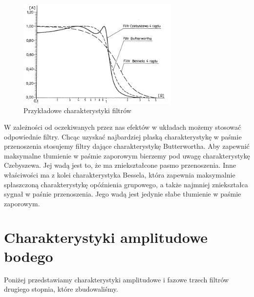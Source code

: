 \documentclass[a4paper,11pt]{article}
\begin{document}
\begin{figure} [H]
  \begin{center}
    \includegraphics[width=8cm]{charakterystyki.png}

    \caption{ Przykładowe charakterystyki filtrów }
  \end{center}
\end{figure} 

W zależności od oczekiwanych przez nas efektów w układach możemy stosować odpowiednie filtry. 
Chcąc uzyskać najbardziej płaską charakterystykę w paśmie przenoszenia stosujemy filtry dające charakterystykę Butterwortha. Aby zapewnić maksymalne tłumienie w paśmie zaporowym bierzemy pod uwagę charakterystykę Czebyszewa. Jej wadą jest to, że ma zniekształcone pasmo przenoszenia. Inne właściwości ma z kolei charakterystyka Bessela, która zapewnia maksymalnie spłaszczoną charakterystykę opóźnienia grupowego, a także najmniej zniekształca sygnał w paśnie przenoszenia. Jego wadą jest jedynie słabe tłumienie w paśmie zaporowym.  



\section{Charakterystyki amplitudowe bodego}

Poniżej przedstawiamy charakterystyki amplitudowe i fazowe trzech filtrów drugiego stopnia, które zbudowaliśmy.
\end{document}
